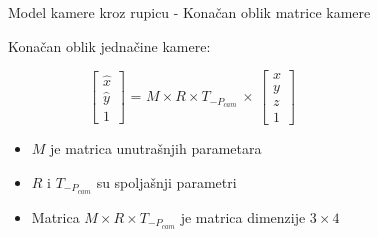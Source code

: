 \documentclass[bookmarks=true,bookmarksopen=true,pdfborder={0 0 0},pdfhighlight={/N},linkbordercolor={.5 .5 .5},implicit=false,unicode,xcolor={table}]{beamer}
\begin{document}
\begin{frame}{Model kamere kroz rupicu - Konačan oblik matrice kamere}

  Konačan oblik jednačine kamere:
  \begin{figure}
    \begin{subfigure}{6cm}
      $\begin{bmatrix}
        \hat{x}\\
        \hat{y}\\
        1
      \end{bmatrix}$
      = $M \times R \times T_{-P_{cam}}$
      $\times$
      $\begin{bmatrix}
        x\\
        y\\
        z\\
        1
      \end{bmatrix}$
    \end{subfigure}
  \end{figure}
  \begin{itemize}
    \item $M$ je matrica unutrašnjih parametara
    \item $R$ i $T_{-P_{cam}}$ su spoljašnji parametri
    \item Matrica $M \times R \times T_{-P_{cam}}$ je matrica dimenzije $3 \times 4$
  \end{itemize}

\end{frame}
\end{document}
